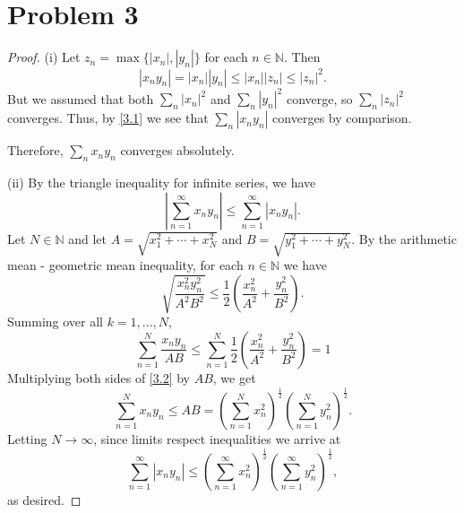 \documentclass{article}
\newcommand{\N}{\mathbb{N}} %
\begin{document}
\section*{Problem 3}
\begin{proof}
	(i) Let $z_n = \max\{|x_n|, |y_n|\}$ for each $n \in \N$. Then
	\begin{equation} \label{3.1}
		|x_n y_n| = |x_n||y_n| \leq |x_n||z_n| \leq |z_n|^2.
	\end{equation}
	But we assumed that both $\sum_n |x_n|^2$ and $\sum_n |y_n|^2$ converge, so $\sum_n |z_n|^2$ converges. Thus, by \eqref{3.1} we see that $\sum_n |x_n y_n|$ converges by comparison.
	
	Therefore, $\sum_n x_n y_n$ converges absolutely.
	
	(ii) By the triangle inequality for infinite series, we have
	\begin{equation}
		\left|\sum_{n=1}^{\infty} x_n y_n \right| \leq \sum_{n=1}^{\infty}|x_n y_n|.
	\end{equation}
	Let $N \in \N$ and let $A = \sqrt{x_1^2 + \cdots + x_N^2}$ and $B = \sqrt{y_1^2 + \cdots + y_N^2}$. By the arithmetic mean - geometric mean inequality, for each $n \in \N$ we have
	\begin{equation}
		\sqrt{\frac{x_n^2 y_n^2}{A^2 B^2}} \leq \frac{1}{2}\left(\frac{x_n^2}{A^2} + \frac{y_n^2}{B^2}\right).
	\end{equation}
	Summing over all $k = 1, ..., N$,
	\begin{equation} \label{3.2}
		\sum_{n=1}^N \frac{x_n y_n}{AB} \leq \sum_{n=1}^N \frac{1}{2}\left(\frac{x_n^2}{A^2} + \frac{y_n^2}{B^2}\right) = 1
	\end{equation}
	Multiplying both sides of \eqref{3.2} by $AB$, we get
	\begin{equation}
		\sum_{n=1}^N x_n y_n \leq AB = \left(\sum_{n=1}^N x_n^2\right)^\frac{1}{2}\left(\sum_{n=1}^N y_n^2\right)^\frac{1}{2}.
	\end{equation}
	Letting $N \to \infty$, since limits respect inequalities we arrive at
	\begin{equation}
		\sum_{n=1}^{\infty}|x_n y_n| \leq \left(\sum_{n=1}^{\infty}x_n^2\right)^\frac{1}{2}\left(\sum_{n=1}^{\infty}y_n^2\right)^\frac{1}{2},
	\end{equation}
	as desired.
\end{proof}
\end{document}
